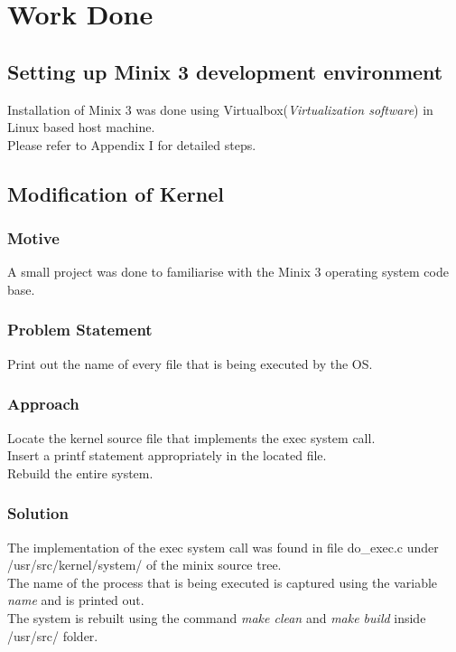 \chapter{Work Done}

\section{Setting up Minix 3 development environment}
Installation of Minix 3 was done using Virtualbox({\em Virtualization software}) in Linux based host machine.\\
Please refer to Appendix I for detailed steps.
\section{Modification of Kernel}
\subsection{Motive}
A small project was done to familiarise with the Minix 3 operating system code base.
\subsection{Problem Statement}
Print out the name of every file that is being executed by the OS.
\subsection{Approach}
Locate the kernel source file that implements the exec system call.\\	
Insert a printf statement appropriately in the located file.\\
Rebuild the entire system.
\subsection{Solution}
The implementation of the exec system call was found in file do\_exec.c under /usr/src/kernel/system/ of the minix source tree.\\
The name of the process that is being executed is captured using the variable { \em name} and is printed out.\\
The system is rebuilt using the command {\em make clean} and { \em make build} inside /usr/src/ folder. 



